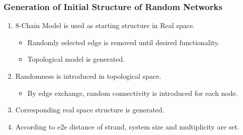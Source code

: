 \documentclass[12pt, dvipdfmx]{beamer}
\begin{document}
\begin{frame}
	\frametitle{Generation of Initial Structure of Random Networks}
	\begin{enumerate}
		\item 8-Chain Model is used as starting structure in \alert{Real space}.
			\begin{itemize}
				\item Randomly selected edge is removed until desired functionality.
				\item Topological model is generated. 
			\end{itemize}
		\item Randomness is introduced in \alert{topological space}.
			\begin{itemize}
				\item By \alert{edge exchange}, random connectivity is introduced for each node.
			\end{itemize}	
		\item Corresponding real space structure is generated.
		\item According to e2e distance of strand, system size and multiplicity are set.
	\end{enumerate}


\end{frame}
\end{document}
